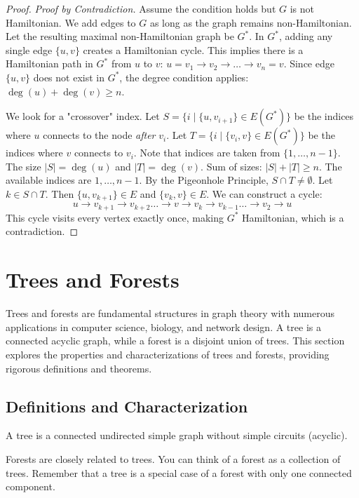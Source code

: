 \begin{proof}
\textit{Proof by Contradiction.}
Assume the condition holds but $G$ is not Hamiltonian. We add edges to $G$ as long as the graph remains non-Hamiltonian. Let the resulting maximal non-Hamiltonian graph be $G^*$.
In $G^*$, adding any single edge $\{u, v\}$ creates a Hamiltonian cycle. This implies there is a Hamiltonian path in $G^*$ from $u$ to $v$: $u = v_1 \to v_2 \to \dots \to v_n = v$.
Since edge $\{u, v\}$ does not exist in $G^*$, the degree condition applies: $\deg(u) + \deg(v) \ge n$.

We look for a "crossover" index. Let $S = \{i \mid \{u, v_{i+1}\} \in E(G^*)\}$ be the indices where $u$ connects to the node \textit{after} $v_i$.
Let $T = \{i \mid \{v_i, v\} \in E(G^*)\}$ be the indices where $v$ connects to $v_i$.
Note that indices are taken from $\{1, \dots, n-1\}$.
The size $|S| = \deg(u)$ and $|T| = \deg(v)$.
Sum of sizes: $|S| + |T| \ge n$.
The available indices are $1, \dots, n-1$. By the Pigeonhole Principle, $S \cap T \neq \emptyset$.
Let $k \in S \cap T$. Then $\{u, v_{k+1}\} \in E$ and $\{v_k, v\} \in E$.
We can construct a cycle:
\[ u \to v_{k+1} \to v_{k+2} \dots \to v \to v_k \to v_{k-1} \dots \to v_2 \to u \]
This cycle visits every vertex exactly once, making $G^*$ Hamiltonian, which is a contradiction.
\end{proof}

\section{Trees and Forests}

Trees and forests are fundamental structures in graph theory with numerous applications in computer science, biology, and network design. A tree is a connected acyclic graph, while a forest is a disjoint union of trees. This section explores the properties and characterizations of trees and forests, providing rigorous definitions and theorems.

\subsection{Definitions and Characterization}

\begin{definition}[Trees]
A tree is a connected undirected simple graph without simple circuits (acyclic).
\end{definition}

Forests are closely related to trees. You can think of a forest as a collection of trees. Remember that a tree is a special case of a forest with only one connected component.

